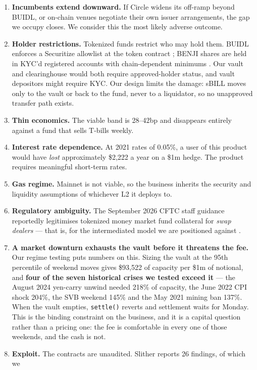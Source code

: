 \documentclass[11pt,a4paper]{article}
\begin{document}
\begin{enumerate}
  \item \textbf{Incumbents extend downward.} If Circle widens its off-ramp beyond BUIDL, or on-chain
  venues negotiate their own issuer arrangements, the gap we occupy closes. We consider this the most
  likely adverse outcome.
  \item \textbf{Holder restrictions.} Tokenized funds restrict who may hold them. BUIDL enforces a
  Securitize allowlist at the token contract \cite{ecokyc,coinpaprika}; BENJI shares are held in
  KYC'd registered accounts with chain-dependent minimums \cite{franklin}. Our vault and
  clearinghouse would both require approved-holder status, and vault depositors might require KYC.
  Our design limits the damage: sBILL moves only to the vault or back to the fund, never to a
  liquidator, so no unapproved transfer path exists.
  \item \textbf{Thin economics.} The viable band is 28--42bp and disappears entirely against a fund
  that sells T-bills weekly.
  \item \textbf{Interest rate dependence.} At 2021 rates of 0.05\%, a user of this product would have
  \emph{lost} approximately \$2,222 a year on a \$1m hedge. The product requires meaningful
  short-term rates.
  \item \textbf{Gas regime.} Mainnet is not viable, so the business inherits the security and
  liquidity assumptions of whichever L2 it deploys to.
  \item \textbf{Regulatory ambiguity.} The September 2026 CFTC staff guidance reportedly legitimises
  tokenized money market fund collateral for \emph{swap dealers} — that is, for the intermediated
  model we are positioned against \cite{protofire}.
  \item \textbf{A market downturn exhausts the vault before it threatens the fee.} Our regime
  testing puts numbers on this. Sizing the vault at the 95th percentile of weekend moves gives
  \$93{,}522 of capacity per \$1m of notional, and \textbf{four of the seven historical crises we
  tested exceed it} — the August 2024 yen-carry unwind needed 218\% of capacity, the June 2022 CPI
  shock 204\%, the SVB weekend 145\% and the May 2021 mining ban 137\%. When the vault empties,
  \texttt{settle()} reverts and settlement waits for Monday. This is the binding constraint on the
  business, and it is a capital question rather than a pricing one: the fee is comfortable in every
  one of those weekends, and the cash is not.
  \item \textbf{Exploit.} The contracts are unaudited. Slither reports 26 findings, of which we

\end{enumerate}
\end{document}
